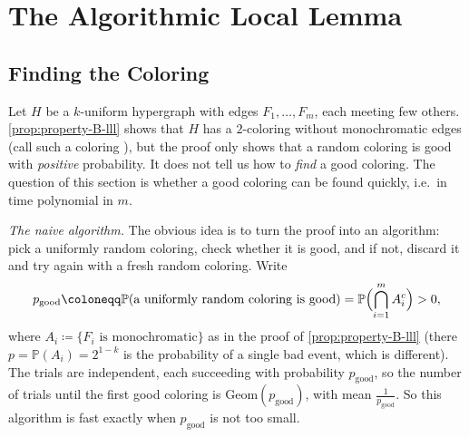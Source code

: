 
\section{The Algorithmic Local Lemma}\label{sec:algorithmic-lll}

\subsection{Finding the Coloring}\label{sec:alll-problem}

Let \(H\) be a \(k\)-uniform hypergraph with edges \(F_{1}, \ldots, F_{m}\), each meeting few others. \autoref{prop:property-B-lll} shows that \(H\) has a \(2\)-coloring without monochromatic edges (call such a coloring ), but the proof only shows that a random coloring is good with \emph{positive} probability. It does not tell us how to \emph{find} a good coloring. The question of this section is whether a good coloring can be found quickly, i.e.\ in time polynomial in \(m\).

\emph{The naive algorithm.} The obvious idea is to turn the proof into an algorithm: pick a uniformly random coloring, check whether it is good, and if not, discard it and try again with a fresh random coloring. Write
\[
    p_{\mathrm{good}} \coloneqq \mathbb{P}(\text{a uniformly random coloring is good}) = \mathbb{P}\Bigl( \bigcap_{i=1}^{m} A_{i}^{c} \Bigr) > 0 ,
\]
where \(A_{i} \coloneqq \{ F_{i} \text{ is monochromatic} \}\) as in the proof of \autoref{prop:property-B-lll} (there \(p = \mathbb{P}(A_{i}) = 2^{1-k}\) is the probability of a single bad event, which is different). The trials are independent, each succeeding with probability \(p_{\mathrm{good}}\), so the number of trials until the first good coloring is \(\mathrm{Geom}(p_{\mathrm{good}})\), with mean \(\frac{1}{p_{\mathrm{good}}}\). So this algorithm is fast exactly when \(p_{\mathrm{good}}\) is not too small.

